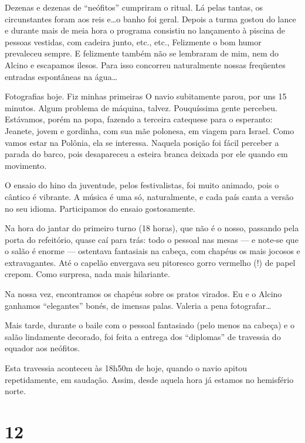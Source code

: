 Dezenas e dezenas de ``neófitos'' cumpriram o ritual. Lá pelas tantas, os circunstantes foram aos reis e\ldots o banho foi geral. Depois a turma gostou do lance e durante mais de meia hora o programa consistiu no lançamento à piscina de pessoas vestidas, com cadeira junto, etc., etc., Felizmente o bom humor prevaleceu sempre. E felizmente também não se lembraram de mim, nem do Alcino e escapamos ilesos. Para isso concorreu naturalmente nossas freqüentes entradas espontâneas na água\ldots

Fotografias hoje. Fiz minhas primeiras O navio subitamente parou, por uns 15 minutos. Algum problema de máquina, talvez. Pouquíssima gente percebeu. Estávamos, porém na popa, fazendo a terceira catequese para o esperanto: Jeanete, jovem e gordinha, com sua mãe polonesa, em viagem para Israel. Como vamos estar na Polônia, ela se interessa. Naquela posição foi fácil perceber a parada do barco, pois desapareceu a esteira branca deixada por ele quando em movimento.

O ensaio do hino da juventude, pelos festivalistas, foi muito animado, pois o cântico é vibrante. A música é uma só, naturalmente, e cada país canta a versão no seu idioma. Participamos do ensaio gostosamente.

Na hora do jantar do primeiro turno (18 horas), que não é o nosso, passando pela porta do refeitório, quase caí para trás: todo o pessoal nas mesas --- e note-se que o salão é enorme --- ostentava fantasiais na cabeça, com chapéus os mais jocosos e extravagantes. Até o capelão envergava seu pitoresco gorro vermelho (!) de papel crepom. Como surpresa, nada mais hilariante.

Na nossa vez, encontramos os chapéus sobre os pratos virados. Eu e o Alcino ganhamos ``elegantes'' bonés, de imensas palas. Valeria a pena fotografar\ldots

Mais tarde, durante o baile com o pessoal fantasiado (pelo menos na cabeça) e o salão lindamente decorado, foi feita a entrega dos ``diplomas'' de travessia do equador aos neófitos.

Esta travessia aconteceu às 18h50m de hoje, quando o navio apitou repetidamente, em saudação. Assim, desde aquela hora já estamos no hemisfério norte.

\section*{12 \adfflatleafright {}}

